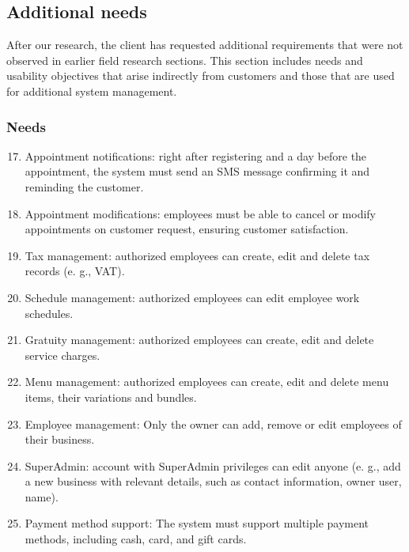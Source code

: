 \documentclass{article}
\begin{document}
\subsection{Additional needs}
After our research, the client has requested additional requirements that were not observed in earlier field research sections. This section includes needs and usability objectives that arise indirectly from customers and those that are used for additional system management.


\subsubsection{Needs}
\label{N17-25}
\begin{enumerate}[label=N\arabic*.]
\setcounter{enumi}{16}
    \item Appointment notifications: right after registering and a day before the appointment, the system must send an SMS message confirming it and reminding the customer.
    \item Appointment modifications: employees must be able to cancel or modify appointments on customer request, ensuring customer satisfaction.
    \item Tax management: authorized employees can create, edit and delete tax records (e. g., VAT).
    \item Schedule management: authorized employees can edit employee work schedules.
    \item Gratuity management: authorized employees can create, edit and delete service charges.
    \item Menu management: authorized employees can create, edit and delete menu items, their variations and bundles. 
    \item Employee management: Only the owner can add, remove or edit employees of their business. 
    \item SuperAdmin: account with SuperAdmin privileges can edit anyone (e. g., add a new business with relevant details, such as contact information, owner user, name).
    \item Payment method support: The system must support multiple payment methods, including cash, card, and gift cards.
\end{enumerate}
\end{document}
